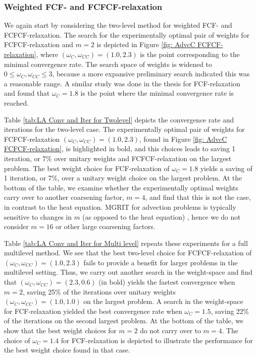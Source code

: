 \documentclass[VANCOUVER,STIX1COL]{WileyNJD-v2}
\begin{document}
\subsubsection{Weighted FCF- and FCFCF-relaxation}
We again start by considering the two-level method for weighted FCF- and FCFCF-relaxation. The search for 
the experimentally optimal pair of weights for FCFCF-relaxation and $m=2$ is depicted in Figure 
\ref{fig: AdvcC FCFCF-relaxation}, where $(\omega_C, \omega_{CC}) = (1.0, 2.3)$ is the point corresponding to the minimal
convergence rate.  The search space of weights is widened to $0 \le \omega_C, \omega_{CC} \le 3$, because 
a more expansive preliminary search indicated this was a reasonable range. A similar 
study was done in the thesis \cite{Su2019_v2} for FCF-relaxation and found that 
$\omega_{C} = 1.8$ is the point where the minimal convergence rate is reached.

Table \ref{tab:LA Conv and Iter for Twolevel} depicts the convergence rate and iterations for 
the two-level case.  The experimentally optimal pair of weights for FCFCF-relaxation $(\omega_C, \omega_{CC}) = (1.0, 2.3)$, found
in Figure \ref{fig: AdvcC FCFCF-relaxation}, is highlighted in bold, and this choices leads to saving 1 iteration, or 
7\% over unitary weights and FCFCF-relaxation on the largest problem.  The best weight choice for FCF-relaxation of $\omega_C = 1.8$
yields a saving of 1 iteration, or 7\%, over a unitary weight choice on the largest problem. 
At the bottom of the table, we examine whether the experimentally optimal weights carry over 
to another coarsening factor, $m=4$, and find that this is not the case, in contrast to the heat equation.  
MGRIT for advection problems is typically sensitive to changes in $m$ (as opposed to the heat equation) \cite{Do2016, HoDeFaMaSc2019}, hence we do not consider $m=16$ or other large coarsening factors.

Table \ref{tab:LA Conv and Iter for Multi level} repeats these experiments for a full multilevel method.
We see that the best two-level choice for FCFCF-relaxation of 
$(\omega_C, \omega_{CC}) = (1.0, 2.3)$ fails to provide a benefit for larger problems 
in the multilevel setting.  Thus, we carry out 
another search in the weight-space and find that $(\omega_C, \omega_{CC}) = (2.3, 0.6)$ (in bold) yields 
the fastest convergence when $m=2$, saving 25\% of the iterations over unitary weights 
$(\omega_C, \omega_{CC}) = (1.0, 1.0)$ on the largest problem.  A search in the weight-space
for FCF-relaxation yielded the best convergence rate when $\omega_C = 1.5$, 
saving 22\% of the iterations on the second largest problem.  At the bottom of the table, we 
show that the best weight choices for $m=2$ do not carry over to $m=4$.  The choice of $\omega_C =
1.4$ for FCF-relaxation is depicted to illustrate the performance for the best weight choice found in 
that case.
\end{document}
